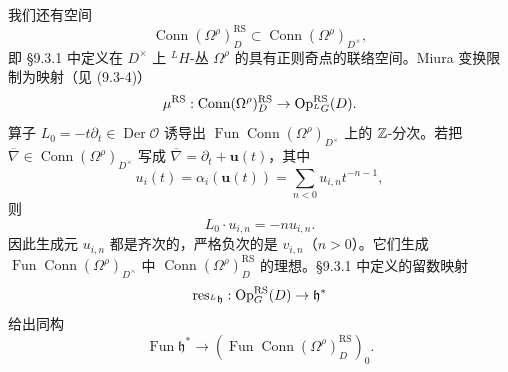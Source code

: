 我们还有空间
\[
    \operatorname{Conn}(\Omega^\rho)^{\mathrm{RS}}_D\subset\operatorname{Conn}(\Omega^\rho)_{D^\times},
\]
即 §9.3.1 中定义在 $D^\times$ 上 ${}^LH$-丛 $\Omega^\rho$ 的具有正则奇点的联络空间。Miura 变换限制为映射（见 (9.3-4)）
\[
    \mu^{\mathrm{RS}}:\operatorname{Conn}(\Omega^\rho)^{\mathrm{RS}}_D\to\operatorname{Op}^{\mathrm{RS}}_{{}^LG}(D).
\]
算子 $L_0=-t\partial_t\in\operatorname{Der}\mathcal{O}$ 诱导出 $\operatorname{Fun}\operatorname{Conn}(\Omega^\rho)_{D^\times}$ 上的 $\mathbb{Z}$-分次。若把 $\overline{\nabla}\in\operatorname{Conn}(\Omega^\rho)_{D^\times}$ 写成 $\overline{\nabla}=\partial_t+\mathbf{u}(t)$，其中
\[
    u_i(t)=\alpha_i(\mathbf{u}(t))=\sum_{n<0}u_{i,n}t^{-n-1},
\]
则
\[
    L_0\cdot u_{i,n}=-nu_{i,n}.
\]
因此生成元 $u_{i,n}$ 都是齐次的，严格负次的是 $v_{i,n}$（$n>0$）。它们生成 $\operatorname{Fun}\operatorname{Conn}(\Omega^\rho)_{D^\times}$ 中 $\operatorname{Conn}(\Omega^\rho)^{\mathrm{RS}}_D$ 的理想。§9.3.1 中定义的留数映射
\[
    \operatorname{res}_{{}^L\mathfrak{h}}:\operatorname{Op}^{\mathrm{RS}}_G(D)\to\mathfrak{h}^*
\]
给出同构
\[
    \operatorname{Fun}\mathfrak{h}^*\to(\operatorname{Fun}\operatorname{Conn}(\Omega^\rho)^{\mathrm{RS}}_D)_0 .
\]


